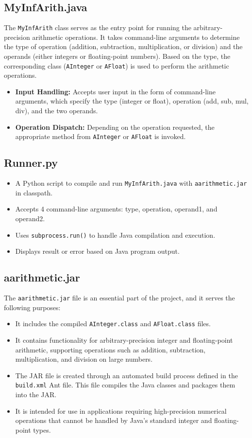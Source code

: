 \documentclass[12pt]{article}
\begin{document}
\subsection{MyInfArith.java}
The \texttt{MyInfArith} class serves as the entry point for running the arbitrary-precision arithmetic operations. It takes command-line arguments to determine the type of operation (addition, subtraction, multiplication, or division) and the operands (either integers or floating-point numbers). Based on the type, the corresponding class (\texttt{AInteger} or \texttt{AFloat}) is used to perform the arithmetic operations.

\begin{itemize}
    \item \textbf{Input Handling:} Accepts user input in the form of command-line arguments, which specify the type (integer or float), operation (add, sub, mul, div), and the two operands.
    \item \textbf{Operation Dispatch:} Depending on the operation requested, the appropriate method from \texttt{AInteger} or \texttt{AFloat} is invoked.
\end{itemize}
\subsection{Runner.py}
\begin{itemize}
    \item A Python script to compile and run \texttt{MyInfArith.java} with \texttt{aarithmetic.jar} in classpath.
    \item Accepts 4 command-line arguments: type, operation, operand1, and operand2.
    \item Uses \texttt{subprocess.run()} to handle Java compilation and execution.
    \item Displays result or error based on Java program output.
\end{itemize}

\subsection{aarithmetic.jar}

The \texttt{aarithmetic.jar} file is an essential part of the project, and it serves the following purposes:

\begin{itemize}
    \item It includes the compiled \texttt{AInteger.class} and \texttt{AFloat.class} files.
    \item It contains functionality for arbitrary-precision integer and floating-point arithmetic, supporting operations such as addition, subtraction, multiplication, and division on large numbers.
    \item The JAR file is created through an automated build process defined in the \texttt{build.xml} Ant file. This file compiles the Java classes and packages them into the JAR.
    \item It is intended for use in applications requiring high-precision numerical operations that cannot be handled by Java's standard integer and floating-point types.
\end{itemize}
\end{document}
